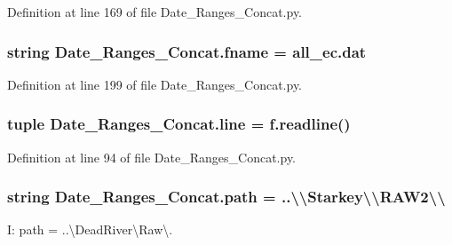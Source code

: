 Definition at line 169 of file Date\+\_\+\+Ranges\+\_\+\+Concat.\+py.

\hypertarget{namespace_date___ranges___concat_a86701c1e83bc108fd48d569692baf90a}{}
\subsubsection[{fname}]{\setlength{\rightskip}{0pt plus 5cm}string Date\+\_\+\+Ranges\+\_\+\+Concat.\+fname = \textquotesingle{}all\+\_\+ec.\+dat\textquotesingle{}}\label{namespace_date___ranges___concat_a86701c1e83bc108fd48d569692baf90a}


Definition at line 199 of file Date\+\_\+\+Ranges\+\_\+\+Concat.\+py.

\hypertarget{namespace_date___ranges___concat_a59784c3a4edaac118af91459499ef2ce}{}
\subsubsection[{line}]{\setlength{\rightskip}{0pt plus 5cm}tuple Date\+\_\+\+Ranges\+\_\+\+Concat.\+line = f.\+readline()}\label{namespace_date___ranges___concat_a59784c3a4edaac118af91459499ef2ce}


Definition at line 94 of file Date\+\_\+\+Ranges\+\_\+\+Concat.\+py.

\hypertarget{namespace_date___ranges___concat_a2b3a66331b773dfcae06fbf3e0426bc8}{}
\subsubsection[{path}]{\setlength{\rightskip}{0pt plus 5cm}string Date\+\_\+\+Ranges\+\_\+\+Concat.\+path = \textquotesingle{}..\textbackslash{}\textbackslash{}Starkey\textbackslash{}\textbackslash{}\+R\+A\+W2\textbackslash{}\textbackslash{}\textquotesingle{}}\label{namespace_date___ranges___concat_a2b3a66331b773dfcae06fbf3e0426bc8}


I\+: path = \textquotesingle{}..\textbackslash{}Dead\+River\textbackslash{}Raw\textbackslash{}\textquotesingle{}. 



